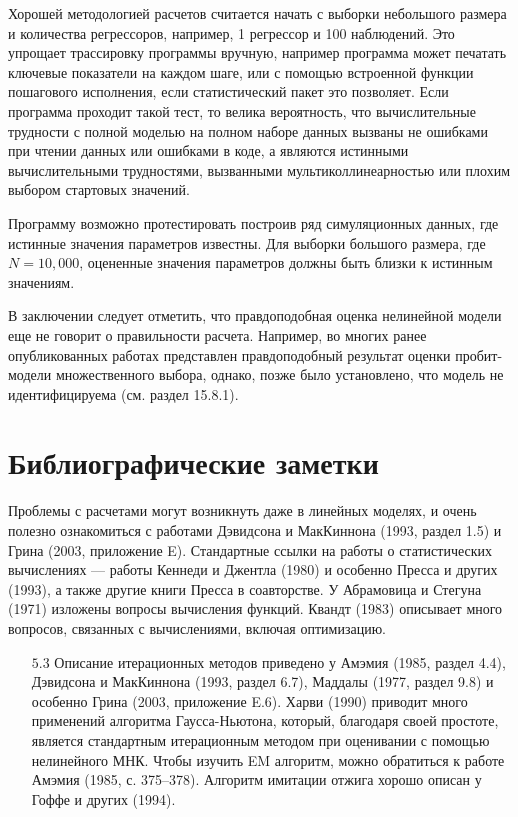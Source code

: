 Хорошей методологией расчетов считается начать с выборки небольшого размера и количества регрессоров, например, 1 регрессор и 100 наблюдений. Это упрощает трассировку программы вручную, например программа может печатать ключевые показатели на каждом шаге, или с помощью встроенной функции пошагового исполнения, если статистический пакет это позволяет. Если программа проходит такой тест, то велика вероятность, что вычислительные трудности с полной моделью на полном наборе данных вызваны не ошибками при чтении данных или ошибками в коде, а являются истинными вычислительными трудностями, вызванными мультиколлинеарностью или плохим выбором стартовых значений.

Программу возможно протестировать построив ряд симуляционных данных, где истинные значения параметров известны. Для выборки большого размера, где $N=10,000$, оцененные значения параметров должны быть близки к истинным значениям. 

В заключении следует отметить, что правдоподобная оценка нелинейной модели еще не говорит о правильности расчета. Например, во многих ранее опубликованных работах представлен правдоподобный результат оценки пробит-модели множественного выбора, однако, позже было установлено, что модель не идентифицируема (см. раздел 15.8.1).


\section{Библиографические заметки}

Проблемы с расчетами могут возникнуть даже в линейных моделях, и очень полезно ознакомиться с работами Дэвидсона и МакКиннона (1993, раздел 1.5) и Грина (2003, приложение E). Стандартные ссылки на работы о статистических вычислениях --- работы Кеннеди и Джентла (1980) и особенно Пресса и других (1993), а также другие книги Пресса в соавторстве. У Абрамовица и Стегуна (1971) изложены вопросы вычисления функций. Квандт (1983) описывает много вопросов, связанных с вычислениями, включая оптимизацию.

\begin{enumerate}
\item [$5.3$] Описание итерационных методов приведено у Амэмия (1985, раздел 4.4), Дэвидсона и МакКиннона (1993, раздел 6.7), Маддалы (1977, раздел 9.8) и особенно Грина (2003, приложение E.6). Харви (1990) приводит много применений алгоритма Гаусса-Ньютона, который, благодаря своей простоте, является стандартным итерационным методом при оценивании с помощью нелинейного МНК. Чтобы изучить EM алгоритм, можно обратиться к работе Амэмия (1985, с. 375–378). Алгоритм имитации отжига хорошо описан у Гоффе и других (1994).
\end{enumerate}

